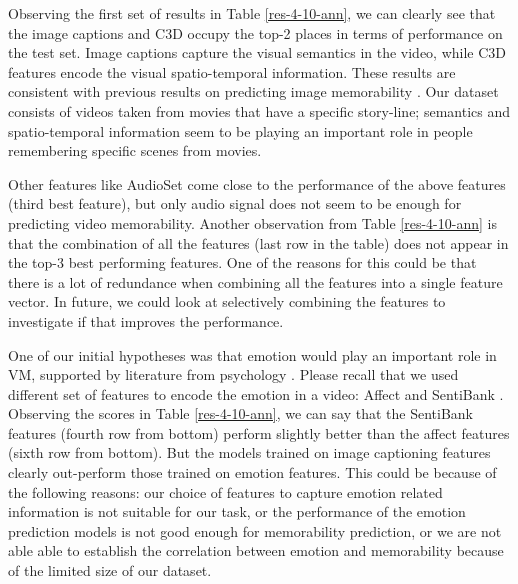 \documentclass[sigconf]{acmart}
\begin{document}
Observing the first set of results in Table \ref{res-4-10-ann}, we can clearly see that the image captions and C3D occupy the top-2 places in terms of performance on the test set. 
Image captions capture the visual semantics in the video, while C3D features encode the visual spatio-temporal information.
These results are consistent with previous results on predicting image memorability \cite{squalli_2017_deep}.
Our dataset consists of videos taken from movies that have a specific story-line; semantics and spatio-temporal information seem to be playing an important role in people remembering specific scenes from movies.

Other features like AudioSet come close to the performance of the above features (third best feature), but only audio signal does not seem to be enough for predicting video memorability.
Another observation from Table \ref{res-4-10-ann} is that the combination of all the features (last row in the table) does not appear in the top-3 best performing features.
One of the reasons for this could be that there is a lot of redundance when combining all the features into a single feature vector.
In future, we could look at selectively combining the features to investigate if that improves the performance. 

One of our initial hypotheses was that emotion would play an important role in VM, supported by literature from psychology \cite{emo-mem}.
Please recall that we used different set of features to encode the emotion in a video: Affect \cite{affect} and SentiBank \cite{sb-feat}.
Observing the scores in Table \ref{res-4-10-ann}, we can say that the SentiBank features (fourth row from bottom) perform slightly better than the affect features (sixth row from bottom).
But the models trained on image captioning features clearly out-perform those trained on emotion features.
This could be because of the following reasons: our choice of features to capture emotion related information is not suitable for our task, or the performance of the emotion prediction models is not good enough for memorability prediction, or we are not able able to establish the correlation between emotion and memorability because of the limited size of our dataset.
\end{document}
